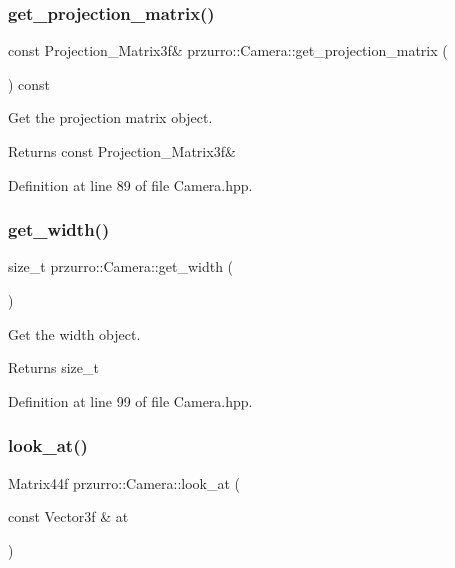 \subsubsection{\texorpdfstring{get\_projection\_matrix()}{get\_projection\_matrix()}}
{\footnotesize\ttfamily const Projection\+\_\+\+Matrix3f\& przurro\+::\+Camera\+::get\+\_\+projection\+\_\+matrix (\begin{DoxyParamCaption}{ }\end{DoxyParamCaption}) const\hspace{0.3cm}{\ttfamily [inline]}}



Get the projection matrix object. 

\begin{DoxyReturn}{Returns}
const Projection\+\_\+\+Matrix3f\& 
\end{DoxyReturn}


Definition at line 89 of file Camera.\+hpp.

\mbox{\label{classprzurro_1_1_camera_aeae692f10b2c622a3e61c366ca33b2d6}} 
\subsubsection{\texorpdfstring{get\_width()}{get\_width()}}
{\footnotesize\ttfamily size\+\_\+t przurro\+::\+Camera\+::get\+\_\+width (\begin{DoxyParamCaption}{ }\end{DoxyParamCaption})\hspace{0.3cm}{\ttfamily [inline]}}



Get the width object. 

\begin{DoxyReturn}{Returns}
size\+\_\+t 
\end{DoxyReturn}


Definition at line 99 of file Camera.\+hpp.

\mbox{\label{classprzurro_1_1_camera_aaec8e7f387d2e5f5d06d16a2e814eba4}} 
\subsubsection{\texorpdfstring{look\_at()}{look\_at()}\hspace{0.1cm}{\footnotesize\ttfamily [1/2]}}
{\footnotesize\ttfamily Matrix44f przurro\+::\+Camera\+::look\+\_\+at (\begin{DoxyParamCaption}\item[{const Vector3f \&}]{at }\end{DoxyParamCaption})}



